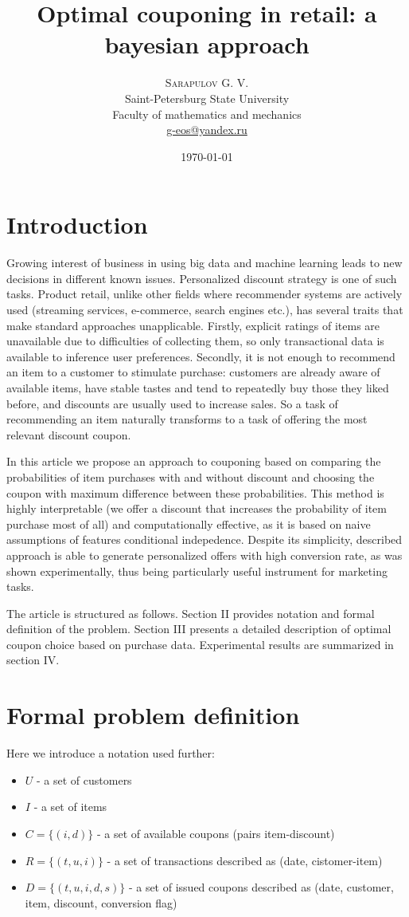 \documentclass[12pt]{article}
\title{Optimal couponing in retail: a bayesian approach} %
\author{%
\textsc{Sarapulov G. V.} \\ %
\normalsize Saint-Petersburg State University \\ %
\normalsize Faculty of mathematics and mechanics \\ %
\normalsize \href{mailto:g-eos@yandex.ru}{g-eos@yandex.ru} %
}
\date{\today} %
\begin{document}
\maketitle


\section{Introduction}
Growing interest of business in using big data and machine learning leads to new decisions in different known issues. Personalized discount strategy is one of such tasks. Product retail, unlike other fields where recommender systems are actively used (streaming services, e-commerce, search engines etc.), has several traits that make standard approaches unapplicable. Firstly, explicit ratings of items are unavailable due to difficulties of collecting them, so only transactional data is available to inference user preferences. Secondly, it is not enough to recommend an item to a customer to stimulate purchase: customers are already aware of available items, have stable tastes and tend to repeatedly buy those they liked before, and discounts are usually used to increase sales. So a task of recommending an item naturally transforms to a task of offering the most relevant discount coupon. \par

In this article we propose an approach to couponing based on comparing the probabilities of item purchases with and without discount and choosing the coupon with maximum difference between these probabilities. This method is highly interpretable (we offer a discount that increases the probability of item purchase most of all) and computationally effective, as it is based on naive assumptions of features conditional indepedence. Despite its simplicity, described approach is able to generate personalized offers with high conversion rate, as was shown experimentally, thus being particularly useful instrument for marketing tasks. \par

The article is structured as follows. Section II provides notation and formal definition of the problem. Section III presents a detailed description of optimal coupon choice based on purchase data. Experimental results are summarized in section IV. \par

\section{Formal problem definition}
Here we introduce a notation used further:
\begin{itemize}
\item $U$ - a set of customers
\item $I$ - a set of items
\item $C = \{(i, d)\}$ - a set of available coupons (pairs item-discount)
\item $R = \{(t, u, i)\}$ - a set of transactions described as (date, cistomer-item)
\item $D = \{(t, u, i, d, s)\}$ - a set of issued coupons described as (date, customer, item, discount, conversion flag)
\end{itemize}
\end{document}
